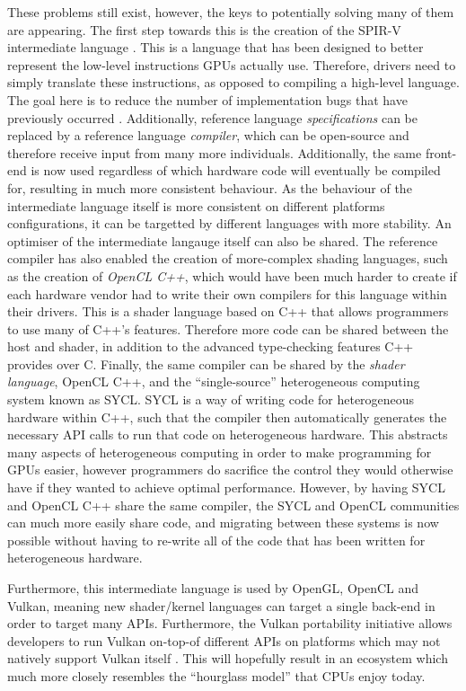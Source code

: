 \documentclass[a4paper,12pt,twoside,openright]{report}
\begin{document}
These problems still exist, however, the keys to potentially solving many of
them are appearing. The first step towards this is the creation of the SPIR-V
intermediate language \cite{SPIRV}. This is a language that has been designed
to better represent the low-level instructions GPUs actually use. Therefore,
drivers need to simply translate these instructions, as opposed to compiling a
high-level language. The goal here is to reduce the number of implementation
bugs that have previously occurred \cite{TODO}. Additionally, reference
language \textit{specifications} can be replaced by a reference language
\textit{compiler}, which can be open-source and therefore receive input from
many more individuals. Additionally, the same front-end is now used regardless
of which hardware code will eventually be compiled for, resulting in much more
consistent behaviour. As the behaviour of the intermediate language itself is
more consistent on different platforms configurations, it can be targetted by
different languages with more stability. An optimiser of the intermediate
langauge itself can also be shared. The reference compiler has also enabled the
creation of more-complex shading languages, such as the creation of
\textit{OpenCL C++}, which would have been much harder to create if each
hardware vendor had to write their own compilers for this language within their
drivers. This is a shader language based on C++ that allows programmers to use
many of C++'s features. Therefore more code can be shared between the host and
shader, in addition to the advanced type-checking features C++ provides over C.
Finally, the same compiler can be shared by the \textit{shader language},
OpenCL C++, and the ``single-source'' heterogeneous computing system known as
SYCL. SYCL is a way of writing code for heterogeneous hardware within C++, such
that the compiler then automatically generates the necessary API calls to run
that code on heterogeneous hardware. This abstracts many aspects of
heterogeneous computing in order to make programming for GPUs easier, however
programmers do sacrifice the control they would otherwise have if they wanted
to achieve optimal performance. However, by having SYCL and OpenCL C++ share
the same compiler, the SYCL and OpenCL communities can much more easily share
code, and migrating between these systems is now possible without having to
re-write all of the code that has been written for heterogeneous hardware.

Furthermore, this intermediate language is used by OpenGL, OpenCL and Vulkan,
meaning new shader/kernel languages can target a single back-end in order to
target many APIs. Furthermore, the Vulkan portability initiative allows
developers to run Vulkan on-top-of different APIs on platforms which may not
natively support Vulkan itself \cite{TODO}. This will hopefully result in an
ecosystem which much more closely resembles the ``hourglass model'' that CPUs
enjoy today. %
\end{document}
